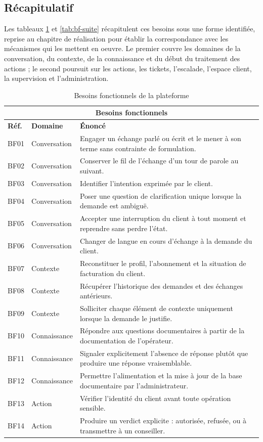 \subsection{Récapitulatif}

Les tableaux \ref{tab:bf} et \ref{tab:bf-suite} récapitulent ces besoins sous une forme identifiée, reprise au chapitre de réalisation pour établir la correspondance avec les mécanismes qui les mettent en oeuvre. Le premier couvre les domaines de la conversation, du contexte, de la connaissance et du début du traitement des actions ; le second poursuit sur les actions, les tickets, l'escalade, l'espace client, la supervision et l'administration.

\begin{table}[H]
\centering
\renewcommand{\arraystretch}{1.2}
\begin{tabular}{|p{1.3cm}|p{3.4cm}|p{9.2cm}|}
\hline
\multicolumn{3}{|c|}{\textbf{Besoins fonctionnels}} \\
\hline
\textbf{Réf.} & \textbf{Domaine} & \textbf{Énoncé} \\
\hline
BF01 & Conversation & Engager un échange parlé ou écrit et le mener à son terme sans contrainte de formulation. \\
\hline
BF02 & Conversation & Conserver le fil de l'échange d'un tour de parole au suivant. \\
\hline
BF03 & Conversation & Identifier l'intention exprimée par le client. \\
\hline
BF04 & Conversation & Poser une question de clarification unique lorsque la demande est ambiguë. \\
\hline
BF05 & Conversation & Accepter une interruption du client à tout moment et reprendre sans perdre l'état. \\
\hline
BF06 & Conversation & Changer de langue en cours d'échange à la demande du client. \\
\hline
BF07 & Contexte & Reconstituer le profil, l'abonnement et la situation de facturation du client. \\
\hline
BF08 & Contexte & Récupérer l'historique des demandes et des échanges antérieurs. \\
\hline
BF09 & Contexte & Solliciter chaque élément de contexte uniquement lorsque la demande le justifie. \\
\hline
BF10 & Connaissance & Répondre aux questions documentaires à partir de la documentation de l'opérateur. \\
\hline
BF11 & Connaissance & Signaler explicitement l'absence de réponse plutôt que produire une réponse vraisemblable. \\
\hline
BF12 & Connaissance & Permettre l'alimentation et la mise à jour de la base documentaire par l'administrateur. \\
\hline
BF13 & Action & Vérifier l'identité du client avant toute opération sensible. \\
\hline
BF14 & Action & Produire un verdict explicite : autorisée, refusée, ou à transmettre à un conseiller. \\
\hline
\end{tabular}
\caption{Besoins fonctionnels de la plateforme}
\label{tab:bf}
\end{table}

